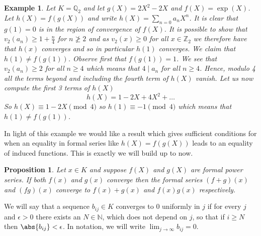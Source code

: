 \documentclass{article}
\newtheorem{proposition}{Proposition}[section]
\newtheorem{example}{Example}[section]
\newcommand{\mbb}[1]{\mathbb{#1}}
\numberwithin{equation}{section}
\begin{document}
\begin{example}\label{ex: h(X) != f(g(X))}
    Let $K = \mbb Q_2$ and let $g(X) = 2X^2 - 2X$ and $f(X) = \exp(X)$. Let $h(X) = f(g(X))$ and write $h(X) = \sum_{n = 0}a_n X^n$. It is clear that $g(1) = 0$ is in the region of convergence of $f(X)$. It is possible to show that $v_2(a_n) \geq 1 + \frac{n}{4}$ for $n \ngeq 2$ and as $v_2(x) \geq 0$ for all $x \in \mbb Z_2$ we therefore have that $h(x)$ converges and so in particular $h(1)$ converges. We claim that $h(1) \neq f(g(1))$. Observe first that $f(g(1))= 1$. We see that $v_2(a_n) \geq 2$ for all $n \geq 4$ which means that $4 \mid a_n$ for all $n \geq 4$. Hence, modulo 4 all the terms beyond and including the fourth term of $h(X)$ vanish. Let us now compute the first 3 terms of $h(X)$ 
    $$h(X) = 1 - 2X + 4X^2 + \ldots$$
    So $h(X) \equiv 1 - 2X \pmod {4}$ so $h(1) \equiv -1 \pmod {4}$ which means that $h(1) \neq f(g(1))$.
\end{example}

In light of this example we would like a result which gives sufficient conditions for when an equality in formal series like $h(X) = f(g(X))$ leads to an equality of induced functions. This is exactly we will build up to now. 

\begin{proposition}\label{prop: Convergence of sum and product of power series}
    Let $x \in K$ and suppose $f(X)$ and $g(X)$ are formal power series. If both $f(x)$ and $g(x)$ converge then the formal series $(f+g)(x)$ and $(fg)(x)$ converge to $f(x) + g(x)$ and $f(x)g(x)$ respectively.
\end{proposition}
    




We will say that a sequence $b_{ij} \in K$ converges to 0 uniformly in $j$ if for every $j$ and $\epsilon > 0$ there exists an $N \in \mbb N$, which does not depend on $j$, so that if $i \geq N$ then $\abs{b_{ij}} < \epsilon$. In notation, we will write $\lim_{j \to \infty}b_{ij} = 0$.
\end{document}
